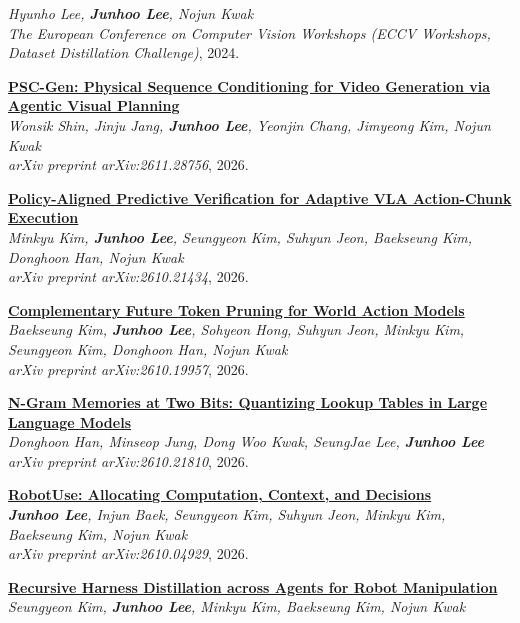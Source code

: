 \documentclass[10pt, letterpaper]{article}
\newcommand{\myname}{\textbf{\textup{Junhoo Lee}}}
\newcommand{\pubid}[1]{\textbf{[#1]}}
\newenvironment{publicationlist}{
    \begin{description}[leftmargin=4.0em, labelwidth=3.2em, labelsep=0.6em, itemsep=0.85mm, topsep=0.5mm, style=multiline, font=\normalfont]
}{
    \end{description}
}
\begin{document}
{\begin{publicationlist}
    \textit{Hyunho Lee, \myname, Nojun Kwak} \\
    \textit{The European Conference on Computer Vision Workshops (ECCV Workshops, Dataset Distillation Challenge)}, 2024.
    \item[\pubid{P1}] \textbf{\href{https://arxiv.org/abs/2611.28756}{PSC-Gen: Physical Sequence Conditioning for Video Generation via Agentic Visual Planning}} \\
    \textit{Wonsik Shin, Jinju Jang, \myname, Yeonjin Chang, Jimyeong Kim, Nojun Kwak} \\
    \textit{arXiv preprint arXiv:2611.28756}, 2026.
    \item[\pubid{P2}] \textbf{\href{https://arxiv.org/abs/2610.21434}{Policy-Aligned Predictive Verification for Adaptive VLA Action-Chunk Execution}} \\
    \textit{Minkyu Kim, \myname, Seungyeon Kim, Suhyun Jeon, Baekseung Kim, Donghoon Han, Nojun Kwak} \\
    \textit{arXiv preprint arXiv:2610.21434}, 2026.
    \item[\pubid{P3}] \textbf{\href{https://arxiv.org/abs/2610.19957}{Complementary Future Token Pruning for World Action Models}} \\
    \textit{Baekseung Kim, \myname, Sohyeon Hong, Suhyun Jeon, Minkyu Kim, Seungyeon Kim, Donghoon Han, Nojun Kwak} \\
    \textit{arXiv preprint arXiv:2610.19957}, 2026.
    \item[\pubid{P4}] \textbf{\href{https://arxiv.org/abs/2610.21810}{N-Gram Memories at Two Bits: Quantizing Lookup Tables in Large Language Models}} \\
    \textit{Donghoon Han, Minseop Jung, Dong Woo Kwak, SeungJae Lee, \myname} \\
    \textit{arXiv preprint arXiv:2610.21810}, 2026.
    \item[\pubid{P5}] \textbf{\href{https://arxiv.org/abs/2610.04929}{RobotUse: Allocating Computation, Context, and Decisions}} \\
    \textit{\myname, Injun Baek, Seungyeon Kim, Suhyun Jeon, Minkyu Kim, Baekseung Kim, Nojun Kwak} \\
    \textit{arXiv preprint arXiv:2610.04929}, 2026.
    \item[\pubid{P6}] \textbf{\href{https://arxiv.org/abs/2609.33378}{Recursive Harness Distillation across Agents for Robot Manipulation}} \\
    \textit{Seungyeon Kim, \myname, Minkyu Kim, Baekseung Kim, Nojun Kwak} \\

\end{publicationlist}}
\end{document}

